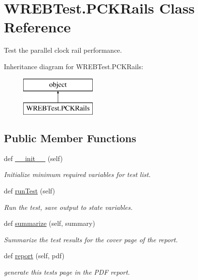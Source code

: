 \hypertarget{class_w_r_e_b_test_1_1_p_c_k_rails}{}\section{W\+R\+E\+B\+Test.\+P\+C\+K\+Rails Class Reference}
\label{class_w_r_e_b_test_1_1_p_c_k_rails}


Test the parallel clock rail performance.  


Inheritance diagram for W\+R\+E\+B\+Test.\+P\+C\+K\+Rails\+:\begin{figure}[H]
\begin{center}
\leavevmode
\includegraphics[height=2.000000cm]{class_w_r_e_b_test_1_1_p_c_k_rails}
\end{center}
\end{figure}
\subsection*{Public Member Functions}
\begin{DoxyCompactItemize}
\item 
def \hyperlink{class_w_r_e_b_test_1_1_p_c_k_rails_a09480a5ceddb45da89954585ca9a8d7b}{\+\_\+\+\_\+init\+\_\+\+\_\+} (self)
\begin{DoxyCompactList}\small\item\em Initialize minimum required variables for test list. \end{DoxyCompactList}\item 
def \hyperlink{class_w_r_e_b_test_1_1_p_c_k_rails_a5e706f60ff883d7222b185e082ea7182}{run\+Test} (self)
\begin{DoxyCompactList}\small\item\em Run the test, save output to state variables. \end{DoxyCompactList}\item 
def \hyperlink{class_w_r_e_b_test_1_1_p_c_k_rails_a905d8777dfc5419eca9975e0318cc0ea}{summarize} (self, summary)
\begin{DoxyCompactList}\small\item\em Summarize the test results for the cover page of the report. \end{DoxyCompactList}\item 
def \hyperlink{class_w_r_e_b_test_1_1_p_c_k_rails_ab37489050c10320ee091de8aadfd68a7}{report} (self, pdf)
\begin{DoxyCompactList}\small\item\em generate this test\textquotesingle{}s page in the P\+DF report. \end{DoxyCompactList}\end{DoxyCompactItemize}



